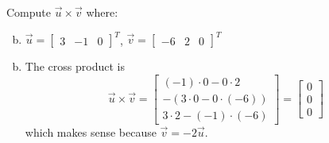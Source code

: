\documentclass[../main.tex]{subfiles}
\begin{document}
Compute \(\vec{u} \times \vec{v}\) where:
\begin{enumerate}[a)]
	\setcounter{enumi}{1}
	\item 
		\(\vec{u} = \begin{bmatrix}3&-1&0\end{bmatrix}^T\),
		\(\vec{v} = \begin{bmatrix}-6&2&0\end{bmatrix}^T\)
\end{enumerate}

\solution
\begin{enumerate}[a)]
	\setcounter{enumi}{1}
	\item The cross product is
		\[
			\vec{u}\times\vec{v}
			=
			\begin{bmatrix}
				(-1)\cdot0 - 0\cdot2 \\
				-(3\cdot0 - 0\cdot(-6)) \\
				3\cdot2 - (-1)\cdot(-6)
			\end{bmatrix}
			=
			\begin{bmatrix}
				0 \\
				0 \\
				0
			\end{bmatrix}
		\]
		which makes sense because $\vec{v} = -2\vec{u}$.
\end{enumerate}
\end{document}
